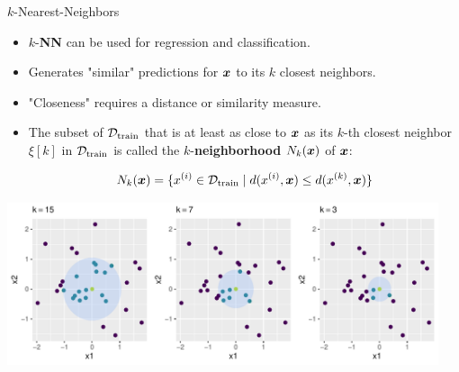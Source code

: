 \begin{vbframe}{$k$-Nearest-Neighbors}

\begin{itemize}
\item $k$-\textbf{NN} can be used for regression and classification.
\item Generates "similar" predictions for $\xv$ to its $k$ closest neighbors.
\item "Closeness" requires a distance or similarity measure.
\item The subset of $\Dtrain$ that is at least as close to $\xv$ as its $k$-th closest neighbor $\xi[k]$ in $\Dtrain$ is called the $k$-\textbf{neighborhood} $N_k(\xv)$ of $\xv$:
\begin{footnotesize}
$$N_k(\xv) = \{ \xi \in \Dtrain \mid d(\xi, \xv) \leq d(\xi[k], \xv)\}$$
\end{footnotesize}
\end{itemize}


\begin{knitrout}\scriptsize
{}\color{fgcolor}

{\centering \includegraphics[width=0.95\textwidth]{figure/reg_knn_1} 

}



\end{knitrout}

\end{vbframe}



    
